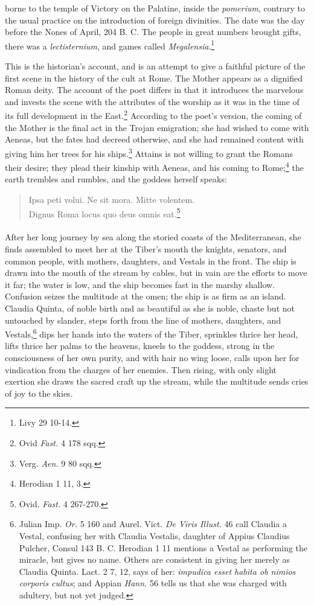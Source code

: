 \documentclass[a4paper, 11pt, oneside, polutonikogreek, english]{article}
\begin{document}
borne to the temple of Victory on the Palatine, inside the \emph{pomerium}, contrary to the usual practice on the introduction of foreign divinities. The date was the day before the Nones of April, 204 B. C. The people in great numbers brought gifts, there was a \emph{lectisternium}, and games called \emph{Megalensia}.\footnote{Livy 29 10-14.}

This is the historian's account, and is an attempt to give a faithful picture of the first scene in the history of the cult at Rome. The Mother appears as a dignified Roman deity. The account of the poet differs in that it introduces the marvelous and invests the scene with the attributes of the worship as it was in the time of its full development in the East.\footnote{Ovid \emph{Fast.} 4 178 sqq.} According to the poet's version, the coming of the Mother is the final act in the Trojan emigration; she had wished to come with Aeneas, but the fates had decreed otherwise, and she had remained content with giving him her trees for his ships.\footnote{Verg. \emph{Aen.} 9 80 sqq.} Attains is not willing to grant the Romans their desire; they plead their kinship with Aeneas, and his coming to Rome;\footnote{Herodian 1 11, 3.} the earth trembles and rumbles, and the goddess herself speaks:
\begin{quote}
Ipsa peti volui. Ne sit mora. Mitte volentem.\\ Dignus Roma locus quo deus omnis eat.\footnote{Ovid. \emph{Fast.} 4 267-270.}  
\end{quote}
\paragraph{}
After her long journey by sea along the storied coasts of the Mediterranean, she finds assembled to meet her at the Tiber's mouth the knights, senators, and common people, with mothers, daughters, and Vestals in the front. The ship is drawn into the mouth of the stream by cables, but in vain are the efforts to move it far; the water is low, and the ship becomes fast in the marshy shallow. Confusion seizes the multitude at the omen; the ship is as firm as an island. Claudia Quinta, of noble birth and as beautiful as she is noble, chaste but not untouched by slander, steps forth from the line of mothers, daughters, and Vestals,\footnote{Julian Imp. \emph{Or.} 5 160 and Aurel. Vict. \emph{De Viris Illust.} 46 call Claudia a Vestal, confusing her with Claudia Vestalis, daughter of Appius Claudius Pulcher, Consul 143 B. C. Herodian 1 11 mentions a Vestal as performing the miracle, but gives no name. Others are consistent in giving her merely as Claudia Quinta. Lact. 2 7, 12, says of her: \emph{impudica esset habita ob nimios corporis cultus}; and Appian \emph{Hann.} 56 tells us that she was charged with adultery, but not yet judged.} dips her hands into the waters of the Tiber, sprinkles thrice her head, lifts thrice her palms to the heavens, kneels to the goddess, strong in the consciousness of her own purity, and with hair no wing loose, calls upon her for vindication from the charges of her enemies. Then rising, with only slight exertion she draws the sacred craft up the stream, while the multitude sends cries of joy to the skies.
\end{document}
